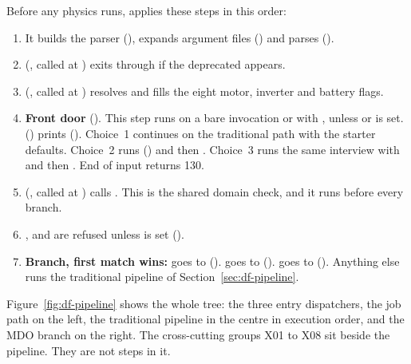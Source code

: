 Before any physics runs,  applies these steps in this order:
\begin{enumerate}
  \item It builds the parser (), expands argument files () and parses ().
  \item {} (, called at ) exits through  if the deprecated  appears.
  \item {} (, called at ) resolves  and fills the eight motor, inverter and battery flags.
  \item \textbf{Front door} (). This step runs on a bare invocation or with , unless  or  is set.  () prints  (). Choice~1 continues on the traditional path with the starter defaults. Choice~2 runs  () and then . Choice~3 runs the same interview with  and then . End of input returns 130.
  \item {} (, called at ) calls . This is the shared domain check, and it runs before every branch.
  \item {},  and  are refused unless  is set ().
  \item \textbf{Branch, first match wins:}  goes to  ().  goes to  ().  goes to  (). Anything else runs the traditional pipeline of Section~\ref{sec:df-pipeline}.
\end{enumerate}

Figure~\ref{fig:df-pipeline} shows the whole tree: the three entry dispatchers, the job path on the left, the traditional pipeline in the centre in execution order, and the MDO branch on the right. The cross-cutting groups X01 to X08 sit beside the pipeline. They are not steps in it.

